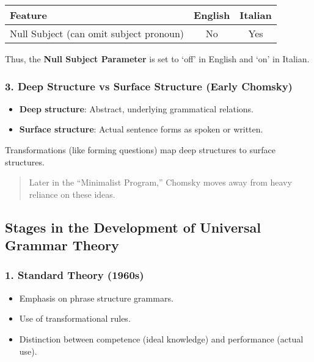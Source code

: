 \documentclass[12pt]{article}
\newcommand{\tightlist}{\itemsep 0pt\parskip 0pt\parsep 0pt}
\begin{document}
\begin{longtable}[]{@{}lcc@{}}
\toprule
Feature & English & Italian \\
\midrule
\endhead
Null Subject (can omit subject pronoun) & No & Yes \\
\bottomrule
\end{longtable}

Thus, the \textbf{Null Subject Parameter} is set to `off' in English and
`on' in Italian.

\hypertarget{deep-structure-vs-surface-structure-early-chomsky}{%
\subsubsection{\texorpdfstring{3. \textbf{Deep Structure vs Surface
Structure (Early
Chomsky)}}{3. Deep Structure vs Surface Structure (Early Chomsky)}}\label{deep-structure-vs-surface-structure-early-chomsky}}

\begin{itemize}
\tightlist
\item
  \textbf{Deep structure}: Abstract, underlying grammatical relations.
\item
  \textbf{Surface structure}: Actual sentence forms as spoken or
  written.
\end{itemize}

Transformations (like forming questions) map deep structures to surface
structures.

\begin{quote}
Later in the ``Minimalist Program,'' Chomsky moves away from heavy
reliance on these ideas.
\end{quote}

\hypertarget{stages-in-the-development-of-universal-grammar-theory}{%
\subsection{Stages in the Development of Universal Grammar
Theory}\label{stages-in-the-development-of-universal-grammar-theory}}

\hypertarget{standard-theory-1960s}{%
\subsubsection{\texorpdfstring{1. \textbf{Standard Theory
(1960s)}}{1. Standard Theory (1960s)}}\label{standard-theory-1960s}}

\begin{itemize}
\tightlist
\item
  Emphasis on phrase structure grammars.
\item
  Use of transformational rules.
\item
  Distinction between competence (ideal knowledge) and performance
  (actual use).
\end{itemize}
\end{document}
